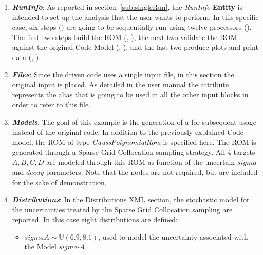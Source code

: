 \begin{enumerate}
   \item \textbf{\textit{RunInfo}}:
   As reported in section~\ref{sub:singleRun}, the \textit{RunInfo} \textbf{Entity} is intended to set up the analysis
   that the user wants to perform. In this specific case, six steps () are going to be sequentially run
   using twelve processors ().  The first two steps build the ROM
   (, ), the next two validate
   the ROM against the original Code Model (, ),
   and the last two produce plots and print data (, ).
   \item \textbf{\textit{Files}}:
   Since the driven code uses a single input file, in this section the original input is placed. As detailed in the user manual
   the attribute   represents the alias that is going to be used in all the other input blocks in order to refer to this file.
   \item \textbf{\textit{Models}}:
 The goal of this example is the generation of a 
 for subsequent usage instead of the original code.  In addition to the previously explained Code model,
 the ROM of type \textit{GaussPolynomialRom} is specified here. The ROM is generated through a Sparse Grid
 Collocation sampling strategy. All 4 targets $A,B,C,D$ are modeled through this ROM as function
 of the uncertain $sigma$ and $decay$ parameters.  Note that the  nodes are not
 required, but are included for the sake of demonstration.
   \item \textbf{\textit{Distributions}}:
  In the Distributions XML section, the stochastic model for the
  uncertainties  treated by the Sparse Grid Collocation sampling are reported. In
  this case eight distributions are defined:
  \begin{itemize}
    \item $sigmaA \sim \mathbb{U}(6.9,8.1)$, used to model the uncertainty
    associated with  the Model \textit{sigma-A}

\end{itemize}
\end{enumerate}
